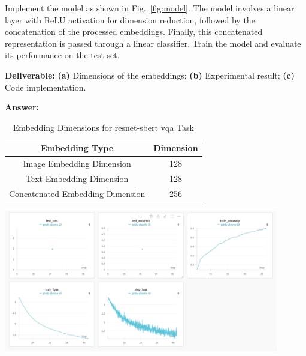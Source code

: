 \documentclass[11pt, oneside]{article}   	%
\begin{document}
Implement the model as shown in Fig.~\ref{fig:model}. The model involves a linear layer with ReLU activation for dimension reduction, followed by the concatenation of the processed embeddings. Finally, this concatenated representation is passed through a linear classifier. Train the model and evaluate its performance on the test set. 

\textbf{Deliverable:} \textbf{(a)} Dimensions of the embeddings; \textbf{(b)} Experimental result; \textbf{(c)} Code implementation.

\textbf{Answer:} \\
\begin{table}[H]
    \centering
    \begin{tabular}{|c|c|}
    \hline
    \textbf{Embedding Type}         & \textbf{Dimension}      \\ \hline
    Image Embedding Dimension       & 128  \\ \hline
    Text Embedding Dimension        & 128  \\ \hline
    Concatenated Embedding Dimension & 256  \\ \hline
    \end{tabular}
    \caption{Embedding Dimensions for resnet-sbert vqa Task}
    \label{table:embedding_dimensions}
\end{table}

\begin{center}
    \includegraphics[width=0.9\textwidth]{p2p1_pic/vqa-resnet-result.png}
\end{center}
\end{document}
